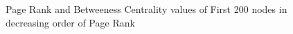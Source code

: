 \documentclass{article}
\begin{document}
\begin{enumerate}
\begin{figure}[!hbtp]
\hfill
{}
\hfill
{}
\hfill
\caption{
\label{case2rankplotPR}%
Page Rank and Betweeness Centrality values of First 200 nodes in decreasing order of Page Rank}
\end{figure}


\end{enumerate}
\end{document}
